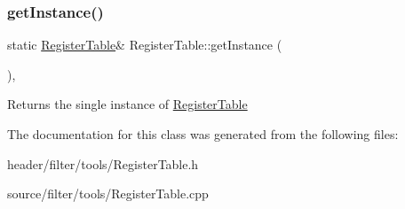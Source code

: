 \subsubsection{\texorpdfstring{get\+Instance()}{getInstance()}}
{\footnotesize\ttfamily static \hyperlink{class_register_table}{Register\+Table}\& Register\+Table\+::get\+Instance (\begin{DoxyParamCaption}{ }\end{DoxyParamCaption})\hspace{0.3cm}{\ttfamily [inline]}, {\ttfamily [static]}}

\begin{DoxyReturn}{Returns}
the single instance of \hyperlink{class_register_table}{Register\+Table} 
\end{DoxyReturn}


The documentation for this class was generated from the following files\+:\begin{DoxyCompactItemize}
\item 
header/filter/tools/Register\+Table.\+h\item 
source/filter/tools/Register\+Table.\+cpp\end{DoxyCompactItemize}
